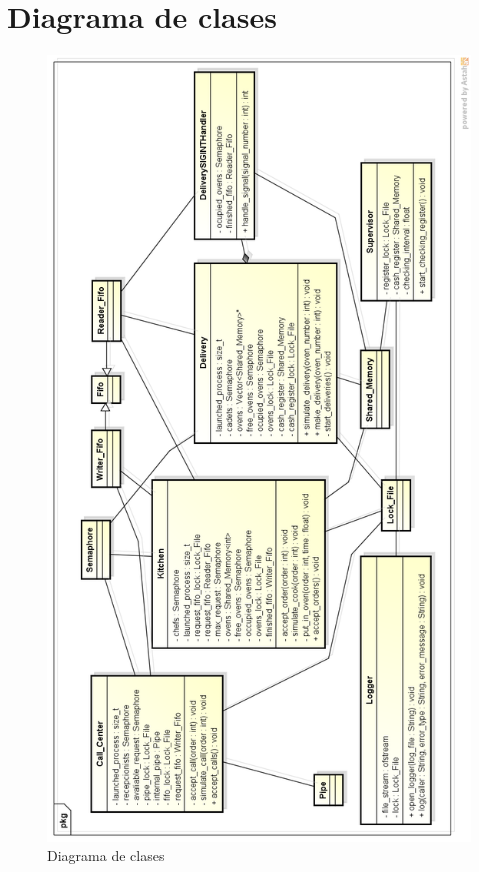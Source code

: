 \documentclass[11pt,spanish,a4paper,openany,notitlepage]{article}
\begin{document}
\newpage

\section{Diagrama de clases}

\begin{figure}[H]
\begin{center}
\includegraphics[width=380pt]{./informe/diagrama-clases.png}
\caption{Diagrama de clases}
\end{center}
\end{figure}
\end{document}
